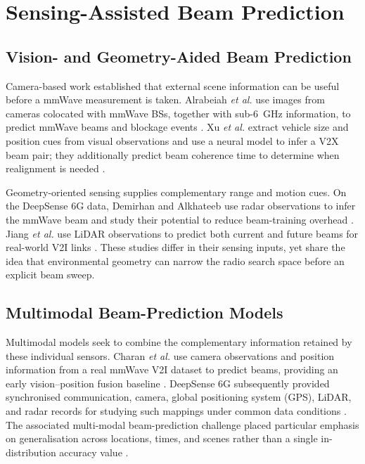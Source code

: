 \section{Sensing-Assisted Beam Prediction}
\label{sec:background-sensing-prediction}

\subsection{Vision- and Geometry-Aided Beam Prediction}
\label{subsec:background-vision-geometry-prediction}

Camera-based work established that external scene information can be useful
before a mmWave measurement is taken.  Alrabeiah \emph{et al.} use images from
cameras colocated with mmWave BSs, together with sub-6~GHz information, to
predict mmWave beams and blockage events \cite{alrabeiah2019millimeterwavebasestations}.
Xu \emph{et al.} extract vehicle size and position cues from visual observations
and use a neural model to infer a V2X beam pair; they additionally predict beam
coherence time to determine when realignment is needed
\cite{xu2022computervisionaidedmmwave}.

Geometry-oriented sensing supplies complementary range and motion cues.  On
the DeepSense 6G data, Demirhan and Alkhateeb use radar observations to infer
the mmWave beam and study their potential to reduce beam-training overhead
\cite{demirhan2021radaraided6gbeam}.  Jiang \emph{et al.} use LiDAR observations
to predict both current and future beams for real-world V2I links
\cite{jiang2022lidaraidedfuturebeam}.  These studies differ in their sensing
inputs, yet share the idea that environmental geometry can narrow the radio
search space before an explicit beam sweep.

\subsection{Multimodal Beam-Prediction Models}
\label{subsec:background-multimodal-beam-prediction}

Multimodal models seek to combine the complementary information retained by
these individual sensors.  Charan \emph{et al.} use camera observations and
position information from a real mmWave V2I dataset to predict beams, providing
an early vision--position fusion baseline \cite{charan2021visionpositionmultimodalbeamprediction}.
DeepSense 6G subsequently provided synchronised communication, camera, global
positioning system (GPS), LiDAR, and radar records for studying such mappings under common data
conditions \cite{alkhateeb2023deepsense6glargescalerealworld}.  The associated
multi-modal beam-prediction challenge placed particular emphasis on
generalisation across locations, times, and scenes rather than a single
in-distribution accuracy value \cite{charan2022multimodalbeampredictionchallenge}.

